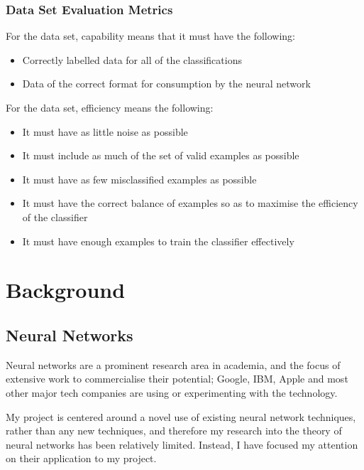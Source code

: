 \documentclass[a4paper]{article}
\begin{document}
\subsubsection{Data Set Evaluation Metrics}
\label{subsubsec:in_cs_dsmetrics}

For the data set, capability means that it must have the following:

\begin{itemize}
\item Correctly labelled data for all of the classifications
\item Data of the correct format for consumption by the neural network
\end{itemize}

For the data set, efficiency means the following:
\begin{itemize}
\item It must have as little noise as possible
\item It must include as much of the set of valid examples as possible
\item It must have as few misclassified examples as possible
\item It must have the correct balance of examples so as to maximise the efficiency of the classifier
\item It must have enough examples to train the classifier effectively
\end{itemize}

\newpage
\section{Background}
\label{sec:bg}

\subsection{Neural Networks}%
\label{subsec:bg_neuralnetworks}

Neural networks are a prominent research area in academia, and the focus of extensive work to commercialise their potential; Google, IBM, Apple and most other major tech companies are using or experimenting with the technology.

My project is centered around a novel use of existing neural network techniques, rather than any new techniques, and therefore my research into the theory of neural networks has been relatively limited. Instead, I have focused my attention on their application to my project.
\end{document}
